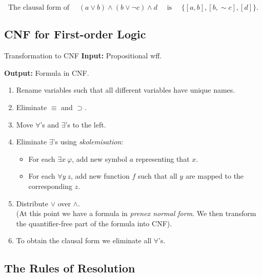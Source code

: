 \documentclass[english]{panikzettel}
\begin{document}
\[ \text{The clausal form of }\quad (a\lor b)\land (b\lor\neg c) \land d \quad\text{ is }\quad \{[a,b],[b,{\sim} c],[d]\}. \]

\subsection{CNF for First-order Logic}

\begin{algo}{Transformation to CNF}
\textbf{Input:} Propositional wff.

\textbf{Output:} Formula in CNF.
\tcblower
\begin{enumerate}
    \item Rename variables such that all different variables have unique names.
    \item Eliminate $\equiv$ and $\supset$.
    \item Move $\forall$'s and $\exists$'s to the left.
    \item Eliminate $\exists$'s using \emph{skolemisation}:
        \begin{itemize}
            \item For each $\exists x~ \varphi$, add new symbol $a$ representing that $x$.
            \item For each $\forall y~ z$, add new function $f$ such that all $y$ are mapped to the corresponding $z$.
        \end{itemize}
    \item Distribute $\lor$ over $\land$. \\
          (At this point we have a formula in \emph{prenex normal form}. We then transform the quantifier-free part of the formula into CNF).
    \item To obtain the clausal form we eliminate all $\forall$'s.
\end{enumerate}
\end{algo}

\subsection{The Rules of Resolution}
\end{document}
